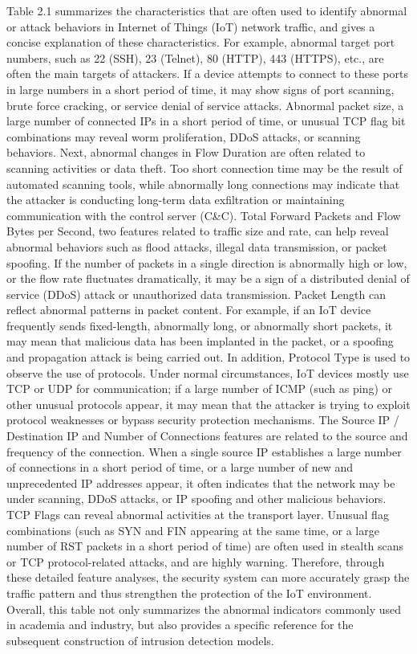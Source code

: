 \begin{ZhChapter}
    Table 2.1 summarizes the characteristics that are often used to identify abnormal or attack behaviors in Internet of Things (IoT) network traffic, and gives a concise explanation of these characteristics. For example, abnormal target port numbers, such as 22 (SSH), 23 (Telnet), 80 (HTTP), 443 (HTTPS), etc., are often the main targets of attackers. If a device attempts to connect to these ports in large numbers in a short period of time, it may show signs of port scanning, brute force cracking, or service denial of service attacks. Abnormal packet size, a large number of connected IPs in a short period of time, or unusual TCP flag bit combinations may reveal worm proliferation, DDoS attacks, or scanning behaviors.
    Next, abnormal changes in Flow Duration are often related to scanning activities or data theft. Too short connection time may be the result of automated scanning tools, while abnormally long connections may indicate that the attacker is conducting long-term data exfiltration or maintaining communication with the control server (C&C).
    Total Forward Packets and Flow Bytes per Second, two features related to traffic size and rate, can help reveal abnormal behaviors such as flood attacks, illegal data transmission, or packet spoofing. If the number of packets in a single direction is abnormally high or low, or the flow rate fluctuates dramatically, it may be a sign of a distributed denial of service (DDoS) attack or unauthorized data transmission.
    Packet Length can reflect abnormal patterns in packet content. For example, if an IoT device frequently sends fixed-length, abnormally long, or abnormally short packets, it may mean that malicious data has been implanted in the packet, or a spoofing and propagation attack is being carried out.
    In addition, Protocol Type is used to observe the use of protocols. Under normal circumstances, IoT devices mostly use TCP or UDP for communication; if a large number of ICMP (such as ping) or other unusual protocols appear, it may mean that the attacker is trying to exploit protocol weaknesses or bypass security protection mechanisms.
    The Source IP / Destination IP and Number of Connections features are related to the source and frequency of the connection. When a single source IP establishes a large number of connections in a short period of time, or a large number of new and unprecedented IP addresses appear, it often indicates that the network may be under scanning, DDoS attacks, or IP spoofing and other malicious behaviors.
    TCP Flags can reveal abnormal activities at the transport layer. Unusual flag combinations (such as SYN and FIN appearing at the same time, or a large number of RST packets in a short period of time) are often used in stealth scans or TCP protocol-related attacks, and are highly warning.
    Therefore, through these detailed feature analyses, the security system can more accurately grasp the traffic pattern and thus strengthen the protection of the IoT environment. Overall, this table not only summarizes the abnormal indicators commonly used in academia and industry, but also provides a specific reference for the subsequent construction of intrusion detection models.


\end{ZhChapter}
